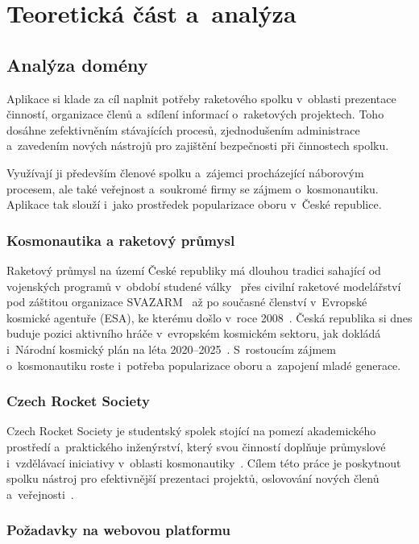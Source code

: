 \chapter{Teoretická část a~analýza}
\label{chap:analyza}

\section{Analýza domény}
Aplikace si klade za cíl naplnit potřeby raketového spolku v~oblasti prezentace činností, organizace členů a~sdílení informací o~raketových projektech. Toho dosáhne zefektivněním stávajících procesů, zjednodušením administrace a~zavedením nových nástrojů pro zajištění bezpečnosti při činnostech spolku.

Využívají ji především členové spolku a~zájemci procházející náborovým procesem, ale také veřejnost a~soukromé firmy se zájmem o~kosmonautiku. Aplikace tak slouží i~jako prostředek popularizace oboru v~České republice.

\subsection{Kosmonautika a raketový průmysl}
Raketový průmysl na území České republiky má dlouhou tradici sahající od vojenských programů v~období studené války~\cite{lehky2017rakety} přes civilní raketové modelářství pod záštitou organizace SVAZARM~\cite{kosmo2004modelarstvi} až po současné členství v~Evropské kosmické agentuře (ESA), ke kterému došlo v~roce 2008~\cite{mzv2024space}. Česká republika si dnes buduje pozici aktivního hráče v~evropském kosmickém sektoru, jak dokládá i~Národní kosmický plán na léta 2020--2025~\cite{czechspace2020plan}. S~rostoucím zájmem o~kosmonautiku roste i~potřeba popularizace oboru a~zapojení mladé generace.

\subsection{Czech Rocket Society}
Czech Rocket Society je studentský spolek stojící na pomezí akademického prostředí a~praktického inženýrství, který svou činností doplňuje průmyslové i~vzdělávací iniciativy v~oblasti kosmonautiky~\cite{crs2024onas}. Cílem této práce je poskytnout spolku nástroj pro efektivnější prezentaci projektů, oslovování nových členů a~veřejnosti~\cite{crs2024web}.


\subsection{Požadavky na webovou platformu}

